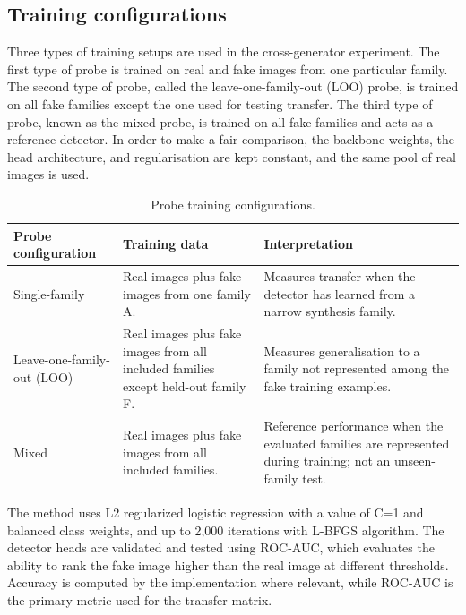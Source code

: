 \subsection{\texorpdfstring{\textbf{Training
configurations}}{Training configurations}}\label{training-configurations}

Three types of training setups are used in the cross-generator
experiment. The first type of probe is trained on real and fake images
from one particular family. The second type of probe, called the
leave-one-family-out (LOO) probe, is trained on all fake families except
the one used for testing transfer. The third type of probe, known as the
mixed probe, is trained on all fake families and acts as a reference
detector. In order to make a fair comparison, the backbone weights, the
head architecture, and regularisation are kept constant, and the same
pool of real images is
used.

\begin{table}[H]
    \centering
    \caption{Probe training configurations.}
    \label{tab:training-configurations}
    \small
    \begin{tabular}{@{}>{\raggedright\arraybackslash}p{}>{\raggedright\arraybackslash}p{}>{\raggedright\arraybackslash}p{}@{}}
        \toprule
        \textbf{Probe configuration} & \textbf{Training data} & \textbf{Interpretation} \\
        \midrule
        Single-family & Real images plus fake images from one family A. & Measures transfer when the detector has learned from a narrow synthesis family. \\
        \addlinespace
        Leave-one-family-out (LOO) & Real images plus fake images from all included families except held-out family F. & Measures generalisation to a family not represented among the fake training examples. \\
        \addlinespace
        Mixed & Real images plus fake images from all included families. & Reference performance when the evaluated families are represented during training; not an unseen-family test. \\
        \bottomrule
    \end{tabular}
\end{table}

The
method uses L2 regularized logistic regression with a value of C=1 and
balanced class weights, and up to 2,000 iterations with L-BFGS
algorithm. The detector heads are validated and tested using ROC-AUC,
which evaluates the ability to rank the fake image higher than the real
image at different thresholds. Accuracy is computed by the
implementation where relevant, while ROC-AUC is the primary metric used
for the transfer matrix.

